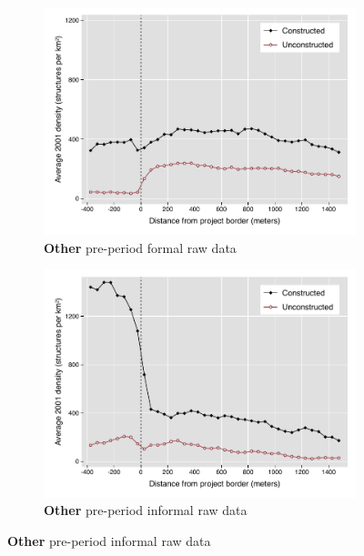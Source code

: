 \documentclass[12pt]{article}
\begin{document}
\begin{figure}
\begin{subfigure}[b]{0.48\textwidth}
        \end{subfigure}
        \begin{subfigure}[b]{0.48\textwidth}
                    \caption[Network2]%
            {{\footnotesize \textbf{Other} pre-period formal  raw data}}   
            \label{fig:prefor}
            \centering
            \includegraphics[width=\textwidth,trim={0.3cm .3cm 0.1cm 0cm}, clip=true]{figures/bblu_for_pre_means_4_3_30k.pdf}

        \end{subfigure}
        \hfill
        \begin{subfigure}[b]{0.48\textwidth}  
                    \caption[]%
            {{\footnotesize \textbf{Other} pre-period informal  raw data}}      
            \label{fig:preinf}
            \centering 
            \includegraphics[width=\textwidth,trim={0.3cm .3cm 0.1cm 0cm}, clip=true]{figures/bblu_inf_pre_means_4_3_30k.pdf}

        \end{subfigure}
\end{figure}
\end{document}
